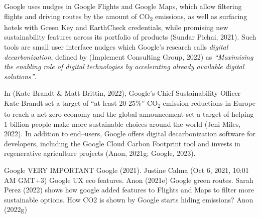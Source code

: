 \documentclass[
  letterpaper,
  DIV=11,
  numbers=noendperiod]{scrartcl}
\begin{document}
Google uses nudges in Google Flights and Google Maps, which allow
filtering flights and driving routes by the amount of
CO\textsubscript{2} emissions, as well as surfacing hotels with Green
Key and EarthCheck credentials, while promising new sustainability
features across its portfolio of products (Sundar Pichai, 2021). Such
tools are small user interface nudges which Google's research calls
\emph{digital decarbonization}, defined by (Implement Consulting Group,
2022) as \emph{``Maximising the enabling role of digital technologies by
accelerating already available digital solutions''}.

In (Kate Brandt \& Matt Brittin, 2022), Google's Chief Sustainability
Officer Kate Brandt set a target of ``at least 20-25\%''
CO\textsubscript{2} emission reductions in Europe to reach a net-zero
economy and the global announcement set a target of helping 1 billion
people make more sustainable choices around the world (Jeni Miles,
2022). In addition to end--users, Google offers digital decarbonization
software for developers, including the Google Cloud Carbon Footprint
tool and invests in regenerative agriculture projects (Anon, 2021g;
Google, 2023).

Google VERY IMPORTANT Google (2021). Justine Calma (Oct 6, 2021, 10:01
AM GMT+3) Google UX eco features. Anon (2021e) Google green routes.
Sarah Perez (2022) shows how google added features to Flights and Maps
to filter more sustainable options. How CO2 is shown by Google starts
hiding emissions? Anon (2022g)
\end{document}
